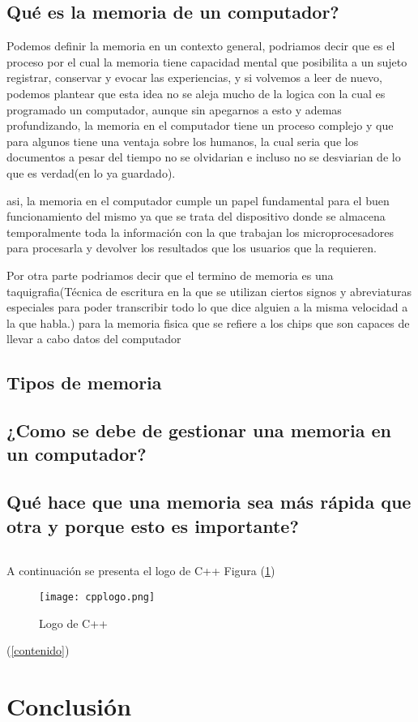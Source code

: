\documentclass{article}
\begin{document}
    \subsection{Qué es la memoria de un computador?}
    Podemos definir la memoria en un contexto general, podriamos decir que es el proceso por el cual la memoria tiene capacidad mental que posibilita a un sujeto registrar, conservar y evocar las experiencias\cite{hipocampo}, y si volvemos a leer de nuevo, podemos plantear que esta idea no se aleja mucho de la logica con la cual es programado un computador, aunque sin apegarnos a esto y ademas profundizando, la memoria en el computador tiene un proceso complejo y que para algunos tiene una ventaja sobre los humanos, la cual seria que los documentos a pesar del tiempo no se olvidarian e incluso no se desviarian de lo que es verdad(en lo ya guardado).
    
    asi, la memoria en el computador cumple un papel fundamental para el buen funcionamiento del mismo  ya que se trata del dispositivo donde se almacena temporalmente toda la información con la que trabajan los microprocesadores para procesarla y devolver los resultados que los usuarios que la requieren.
    
    Por otra parte podriamos decir que el termino de memoria es una taquigrafia(Técnica de escritura en la que se utilizan ciertos signos y abreviaturas especiales para poder transcribir todo lo que dice alguien a la misma velocidad a la que habla.) para la memoria fisica que se refiere a los chips que son capaces de llevar a cabo datos del computador
    \subsection{Tipos de memoria}
    \subsection{¿Como se debe de gestionar una memoria en un computador?}
    \subsection{Qué hace que una memoria sea más rápida que otra y porque esto es importante?}
    
\cite{dirac}

\begin{lstlisting}

\end{lstlisting}

A continuación se presenta el logo de C++ Figura (\ref{fig:cpplogo})

\begin{figure}[h]
\texttt{[image: cpplogo.png]}
\centering
\caption{Logo de C++}
\label{fig:cpplogo}
\end{figure}

(\ref{contenido})

\section{Conclusión} \label{conclulsion}



\end{document}
